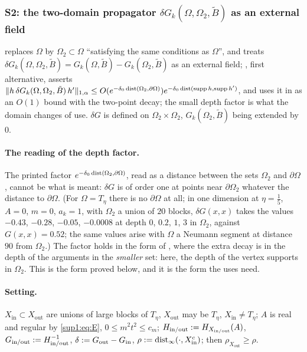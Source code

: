 
\subsubsection{S2: the two-domain propagator $\delta G_k(\Omega,\Omega_2,\tilde B)$ as an external field}\label{sup1:ssec:S2}

\cite[p.~414]{Ba3} replaces $\Omega$ by $\Omega_2\subset\Omega$ ``satisfying the same conditions as $\Omega$'', and treats $\delta G_k(\Omega,\Omega_2,\tilde B)=G_k(\Omega,\tilde B)-G_k(\Omega_2,\tilde B)$ as an external field; \cite[(2.5)]{Ba3}, first alternative, asserts $\lVert h\,\delta G_k(\Omega,\Omega_2,\tilde B)\,h'\rVert_{1,\alpha}\le O(e^{-\delta_0\operatorname{dist}(\Omega_2,\partial\Omega)})e^{-\delta_0\operatorname{dist}(\operatorname{supp} h,\operatorname{supp} h')}$, and \cite[p.~426]{Ba3} uses it in \cite[(2.13)]{Ba3} as an $O(1)$ bound with the two-point decay; the small depth factor is what the domain changes of \cite[pp.~421--422]{Ba3} use. $\delta G$ is defined on $\Omega_2\times\Omega_2$, $G_k(\Omega_2,\tilde B)$ being extended by $0$.

\paragraph{The reading of the depth factor.} The printed factor $e^{-\delta_0\operatorname{dist}(\Omega_2,\partial\Omega)}$, read as a distance between the sets $\Omega_2$ and $\partial\Omega$, cannot be what is meant: $\delta G$ is of order one at points near $\partial\Omega_2$ whatever the distance to $\partial\Omega$. (For $\Omega=T_\eta$ there is no $\partial\Omega$ at all; in one dimension at $\eta=\frac15$, $A=0$, $m=0$, $a_k=1$, with $\Omega_2$ a union of $20$ blocks, $\delta G(x,x)$ takes the values $-0.43$, $-0.28$, $-0.05$, $-0.0008$ at depth $0$, $0.2$, $1$, $3$ in $\Omega_2$, against $G(x,x)=0.52$; the same values arise with $\Omega$ a Neumann segment at distance $90$ from $\Omega_2$.) The factor holds in the form of \cite[Prop.~2.1, (2.26)]{Ba1}, where the extra decay is in the depth of the arguments in the \emph{smaller} set: here, the depth of the vertex supports in $\Omega_2$. This is the form proved below, and it is the form the uses need.

\paragraph{Setting.} $X_{\mathrm{in}}\subset X_{\mathrm{out}}$ are unions of large blocks of $T_\eta$, $X_{\mathrm{out}}$ may be $T_\eta$, $X_{\mathrm{in}}\ne T_\eta$; $A$ is real and regular by \eqref{sup1:eq:E}, $0\le m^2t^2\le c_m$; $H_{\mathrm{in/out}}:= H_{X_{\mathrm{in/out}}}(A)$, $G_{\mathrm{in/out}}:= H_{\mathrm{in/out}}^{-1}$, $\delta:= G_{\mathrm{out}}-G_{\mathrm{in}}$, $\rho:=\operatorname{dist}_\infty(\cdot,X_{\mathrm{in}}^c)$; then $\rho_{X_{\mathrm{out}}}\ge\rho$.

